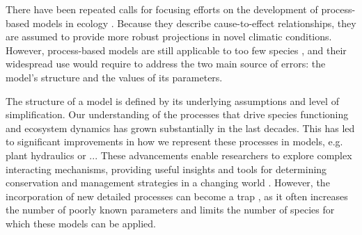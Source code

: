 \documentclass[letterpaper,8pt]{extarticle}  %
\begin{document}
\begin{doublespacing}
\begin{linenumbers}

There have been repeated calls for focusing efforts on the development of process-based models in ecology \citep{Urban2016, Singer2016, Pilowsky2022}. Because they describe cause-to-effect relationships, they are assumed to provide more robust projections in novel climatic conditions. However, process-based models are still applicable to too few species \citep{Evans2016}, and their widespread use would require to address the two main source of errors: the model's structure and the values of its parameters.

The structure of a model is defined by its underlying assumptions and level of simplification. Our understanding of the processes that drive species functioning and ecosystem dynamics has grown substantially in the last decades. This has led to significant improvements in how we represent these processes in models, e.g. plant hydraulics \citep{Ruffault2022} or ... %
These advancements enable researchers to explore complex interacting mechanisms, providing useful insights and tools for determining conservation and management strategies in a changing world \citep{Urban2016}. However, the incorporation of new detailed processes can become a trap \citep{Franklin2020}, as it often increases the number of poorly known parameters and limits the number of species for which these models can be applied. %


\end{linenumbers}
\end{doublespacing}
\end{document}
